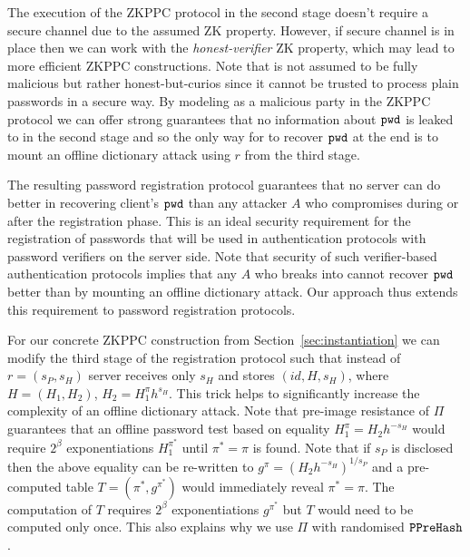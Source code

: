 The execution of the \ac{ZKPPC} protocol in the second stage doesn't require a secure channel due to the assumed ZK property. However, if secure channel is in place then we can work with the \emph{honest-verifier} ZK property, which may lead to more efficient \ac{ZKPPC} constructions. Note that \Server is not assumed to be fully malicious but rather honest-but-curios since it cannot be trusted to process plain passwords in a secure way. By modeling \Server as a malicious party in the \ac{ZKPPC} protocol we can offer strong guarantees that no information about $\mathtt{pwd}$ is leaked to \Server in the second stage and so the only way for \Server to recover $\mathtt{pwd}$ at the end is to mount an offline dictionary attack using $r$ from the third stage.

The resulting password registration protocol guarantees that no server \Server can do better in recovering client's $\mathtt{pwd}$ than any attacker $A$ who compromises \Server during or after the registration phase. This is an ideal security requirement for the registration of passwords that will be used in authentication protocols with password verifiers on the server side. Note that security of such verifier-based authentication protocols implies that any $A$ who breaks into \Server cannot recover $\mathtt{pwd}$ better than by mounting an offline dictionary attack. Our approach thus extends this requirement to password registration protocols.

For our concrete \ac{ZKPPC} construction from Section~\ref{sec:instantiation} we can modify the third stage of the registration protocol such that instead of $r=(s_P,s_H)$ server \Server receives only $s_H$ and stores $(id, H, s_H)$, where $H=(H_1, H_2)$, $H_2=H_1^\pi h^{s_H}$. This trick helps to significantly increase the complexity of an offline dictionary attack. Note that pre-image resistance of $\Pi$ guarantees that an offline password test based on equality $H_1^{\pi} = H_2h^{-s_H}$ would require $2^\beta$ exponentiations $H_1^{\pi^\ast}$ until $\pi^\ast=\pi$ is found. Note that if $s_P$ is disclosed then the above equality can be re-written to $g^{\pi} = (H_2h^{-s_H})^{1/s_P}$ and a pre-computed table $T=(\pi^\ast, g^{\pi^\ast})$ would immediately reveal $\pi^\ast=\pi$. The computation of $T$ requires $2^\beta$ exponentiations $g^{\pi^\ast}$ but $T$ would need to be computed only once. This also explains why we use $\Pi$ with randomised $\mathtt{PPreHash}$.
